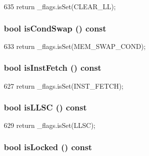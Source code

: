 \begin{DoxyCode}
635 { return _flags.isSet(CLEAR_LL); }
\end{DoxyCode}
\hypertarget{classRequest_a086ef1e55d60089d0aa0232ff797eaef}{
\subsubsection[{isCondSwap}]{\setlength{\rightskip}{0pt plus 5cm}bool isCondSwap () const}}
\label{classRequest_a086ef1e55d60089d0aa0232ff797eaef}



\begin{DoxyCode}
633 { return _flags.isSet(MEM_SWAP_COND); }
\end{DoxyCode}
\hypertarget{classRequest_ae742b8e8aaa2e18506dc64c7b7f3fc0a}{
\subsubsection[{isInstFetch}]{\setlength{\rightskip}{0pt plus 5cm}bool isInstFetch () const}}
\label{classRequest_ae742b8e8aaa2e18506dc64c7b7f3fc0a}



\begin{DoxyCode}
627 { return _flags.isSet(INST_FETCH); }
\end{DoxyCode}
\hypertarget{classRequest_a8965874e960faf91ad4b6af8dbf31875}{
\subsubsection[{isLLSC}]{\setlength{\rightskip}{0pt plus 5cm}bool isLLSC () const}}
\label{classRequest_a8965874e960faf91ad4b6af8dbf31875}



\begin{DoxyCode}
629 { return _flags.isSet(LLSC); }
\end{DoxyCode}
\hypertarget{classRequest_ae0c9fa9daf2467984aea571a0f3940c6}{
\subsubsection[{isLocked}]{\setlength{\rightskip}{0pt plus 5cm}bool isLocked () const}}
\label{classRequest_ae0c9fa9daf2467984aea571a0f3940c6}



